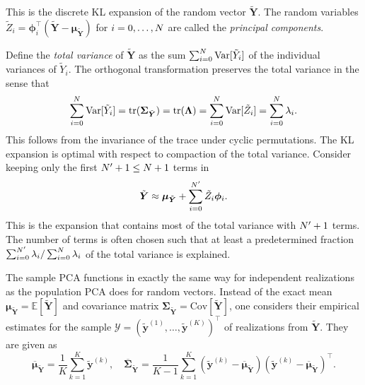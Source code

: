 This is the discrete KL expansion of the random vector \(\tilde{\bm{Y}}\).
The random variables \(\tilde{Z}_i = \bm{\phi}_i^\top (\tilde{\bm{Y}}-\bm{\mu}_{\tilde{\bm{Y}}})\) for \(i=0,\ldots,N\) are called the \emph{principal components}.
\par %
Define the \emph{total variance} of \(\tilde{\bm{Y}}\) as the sum \(\sum_{i=0}^N \mathrm{Var}[\tilde{Y}_i]\) of the individual variances of \(\tilde{Y}_i\).
The orthogonal transformation preserves the total variance in the sense that
\begin{equation} \label{eq:Hydro:TotalVariance}
  \sum_{i=0}^N \mathrm{Var}[\tilde{Y}_i] = \operatorname{tr}(\bm{\Sigma}_{\tilde{\bm{Y}}})
  = \operatorname{tr}(\bm{\Lambda}) = \sum_{i=0}^N \mathrm{Var}[\tilde{Z}_i] = \sum_{i=0}^N \lambda_i.
\end{equation}
This follows from the invariance of the trace under cyclic permutations.
The KL expansion is optimal with respect to compaction of the total variance.
Consider keeping only the first \(N^\prime + 1\leq N + 1\) terms in
\begin{equation} \label{eq:Hydro:TruncatedKLE}
  \tilde{\bm{Y}} \approx \bm{\mu}_{\tilde{\bm{Y}}} + \sum\limits_{i=0}^{N^\prime} \tilde{Z}_i \bm{\phi}_i.
\end{equation}
This is the expansion that contains most of the total variance with \(N^\prime + 1\) terms.
The number of terms is often chosen such that at least a predetermined fraction
\(\sum_{i=0}^{N^\prime} \lambda_i / \sum_{i=0}^N \lambda_i\) of the total variance is explained.
\par %
The sample PCA functions in exactly the same way for independent realizations as the population PCA does for random vectors.
Instead of the exact mean \(\bm{\mu}_{\tilde{\bm{Y}}} = \mathds{E}[\tilde{\bm{Y}}]\) and covariance matrix \(\bm{\Sigma}_{\tilde{\bm{Y}}} = \mathrm{Cov}[\tilde{\bm{Y}}]\),
one considers their empirical estimates for the sample \(\mathcal{Y} = (\tilde{\bm{y}}^{(1)},\ldots,\tilde{\bm{y}}^{(K)})^\top\) of realizations from \(\tilde{\bm{Y}}\).
They are given as
\begin{equation} \label{eq:Hydro:EmpiricalMoments}
  \overline{\bm{\mu}}_{\tilde{\bm{Y}}} = \frac{1}{K} \sum\limits_{k=1}^K \tilde{\bm{y}}^{(k)}, \quad
  \overline{\bm{\Sigma}}_{\tilde{\bm{Y}}}
  = \frac{1}{K-1} \sum\limits_{k=1}^K (\tilde{\bm{y}}^{(k)}-\overline{\bm{\mu}}_{\tilde{\bm{Y}}})(\tilde{\bm{y}}^{(k)}-\overline{\bm{\mu}}_{\tilde{\bm{Y}}})^\top.
\end{equation}
